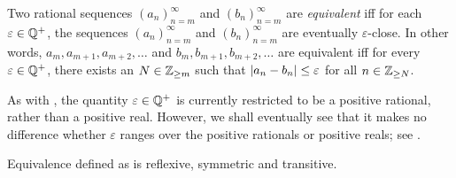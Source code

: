 \setcounter{thm}{5}
\begin{defn}\label{i:5.2.6}
  Two rational sequences \((a_n)_{n = m}^{\infty}\) and \((b_n)_{n = m}^{\infty}\) are \emph{equivalent} iff for each \(\varepsilon \in \mathbb{Q}^+\), the sequences \((a_n)_{n = m}^{\infty}\) and \((b_n)_{n = m}^{\infty}\) are eventually \(\varepsilon\)-close.
  In other words, \(a_m, a_{m + 1}, a_{m + 2}, \dots\) and \(b_m, b_{m + 1}, b_{m + 2}, \dots\) are equivalent iff for every \(\varepsilon \in \mathbb{Q}^+\), there exists an \(N \in \mathbb{Z}_{\geq m}\) such that \(\left\lvert a_n - b_n\right\rvert \leq \varepsilon\) for all \(n \in \mathbb{Z}_{\geq N}\).
\end{defn}

\begin{rmk}\label{i:5.2.7}
  As with , the quantity \(\varepsilon \in \mathbb{Q}^+\) is currently restricted to be a positive rational, rather than a positive real.
  However, we shall eventually see that it makes no difference whether \(\varepsilon\) ranges over the positive rationals or positive reals;
  see .
\end{rmk}

\begin{ac}\label{i:ac:5.2.1}
  Equivalence defined as  is reflexive, symmetric and transitive.
\end{ac}

